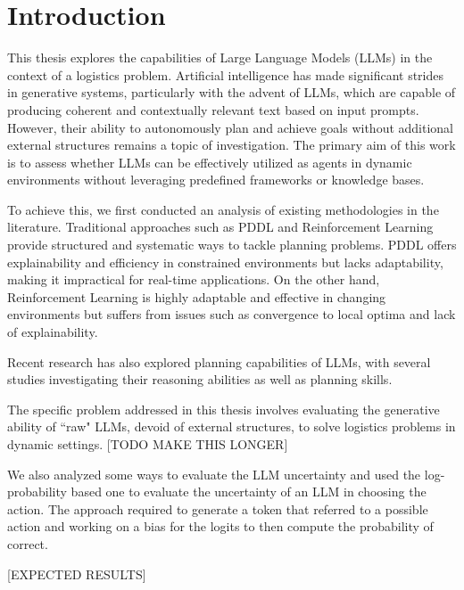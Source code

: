 \chapter{Introduction}
\label{cha:introduction}

This thesis explores the capabilities of Large Language Models (LLMs) in the
context of a logistics problem. Artificial intelligence has made significant strides
in generative systems, particularly with the advent of LLMs, which are capable of
producing coherent and contextually relevant text based on input prompts.
However, their ability to autonomously plan and achieve goals without additional
external structures remains a topic of investigation. The primary aim of this
work is to assess whether LLMs can be effectively utilized as agents in dynamic
environments without leveraging predefined frameworks or knowledge bases.

To achieve this, we first conducted an analysis of existing methodologies in the
literature. Traditional approaches such as PDDL and Reinforcement Learning
provide structured and systematic ways to tackle planning problems. PDDL offers explainability
and efficiency in constrained environments but lacks adaptability, making it
impractical for real-time applications. On the other hand, Reinforcement
Learning is highly adaptable and effective in changing environments but suffers
from issues such as convergence to local optima and lack of explainability.

Recent research has also explored planning capabilities of LLMs, with several studies
investigating their reasoning abilities as well as planning skills.

The specific problem addressed in this thesis involves evaluating the generative
ability of ``raw" LLMs, devoid of external structures, to solve logistics
problems in dynamic settings. [TODO MAKE THIS LONGER]

We also analyzed some ways to evaluate the LLM uncertainty and used the log-probability
based one to evaluate the uncertainty of an LLM in choosing the action. The approach
required to generate a token that referred to a possible action and working on a
bias for the logits to then compute the probability of correct.

[EXPECTED RESULTS]

